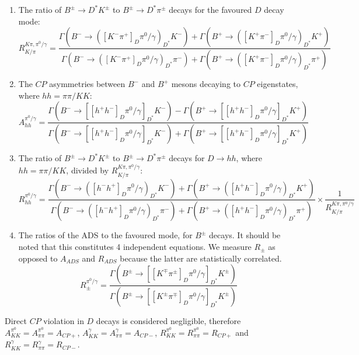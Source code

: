 \documentclass[oneside,12pt]{article}
\begin{document}
\begin{enumerate}
  \item The ratio of $B^{\pm} \rightarrow D^* K^{\pm}$ to $B^{\pm} \rightarrow
  D^* \pi^{\pm}$ decays for the favoured $D$ decay mode:
  \begin{equation}
    R^{K\pi , \pi^0 /\gamma}_{K/\pi}=\frac{\Gamma(B^{-}\rightarrow
    ([K^{-}\pi^{+}]_D\pi^0 /\gamma)_{D^*}K^{-})+\Gamma(B^{+}\rightarrow
    ([K^{+}\pi^{-}]_D\pi^0 /\gamma)_{D^*}K^{+})}{\Gamma(B^{-}\rightarrow
    ([K^{-}\pi^{+}]_D\pi^0 /\gamma)_{D^*}\pi^{-})+\Gamma(B^{+}\rightarrow
    ([K^{+}\pi^{-}]_D\pi^0 /\gamma)_{D^*}\pi^{+})}
	\label{eq:R_DstK_Dstpi}
  \end{equation}
  \item The $CP$ asymmetries between $B^{-}$ and $B^{+}$ mesons decaying to $CP$
  eigenstates, where $hh=\pi \pi /KK$:
		\begin{equation}
      A_{hh}^{\pi^{0}/\gamma}=\frac{\Gamma(B^{-}\rightarrow
      [[h^{+}h^{-}]_{D}\pi^{0}/\gamma]_{D^{*}}K^{-})-\Gamma(B^{+}\rightarrow
      [[h^{+}h^{-}]_{D}\pi^{0}/\gamma]_{D^{*}}K^{+})}{\Gamma(B^{-}\rightarrow
      [[h^{+}h^{-}]_{D}\pi^{0}/\gamma]_{D^{*}}K^{-})+\Gamma(B^{+}\rightarrow
      [[h^{+}h^{-}]_{D}\pi^{0}/\gamma]_{D^{*}}K^{+})} \label{eq:Aglw}
		\end{equation}
  \item The ratio of $B^{\pm} \rightarrow D^* K^{\pm}$ to $B^{\pm} \rightarrow
  D^* \pi^{\pm}$ decays for $D\rightarrow hh$, where $hh=\pi \pi /KK$, divided
  by $R^{K\pi , \pi^0 /\gamma}_{K/\pi}$:
		\begin{equation}
      R_{hh}^{\pi^{0}/\gamma}=\frac{\Gamma(B^{-}\rightarrow
      ([h^{-}h^{+}]_D\pi^0 /\gamma)_{D^*}K^{-})+\Gamma(B^{+}\rightarrow
      ([h^{+}h^{-}]_D\pi^0 /\gamma)_{D^*}K^{+})}{\Gamma(B^{-}\rightarrow
      ([h^{-}h^{+}]_D\pi^0 /\gamma)_{D^*}\pi^{-})+\Gamma(B^{+}\rightarrow
      ([h^{+}h^{-}]_D\pi^0 /\gamma)_{D^*}\pi^{+})} \times \frac{1}{R^{K\pi ,
      \pi^0 /\gamma}_{K/\pi}}
		\end{equation}
  \item The ratios of the ADS to the favoured mode, for $B^{\pm}$ decays. It
  should be noted that this constitutes 4 independent equations. We measure
  $R_{\pm}$ as opposed to $A_{ADS}$ and $R_{ADS}$ because the latter are
  statistically correlated. 
		\begin{equation}
			R_{\pm}^{\pi^{0}/\gamma}=\frac{\Gamma(B^{\pm}\rightarrow
			[[K^{\mp}\pi^{\pm}]_{D}\pi^{0}/\gamma]_{D^{*}}K^{\pm})}{\Gamma(B^{\pm}\rightarrow
			[[K^{\pm}\pi^{\mp}]_{D}\pi^{0}/\gamma]_{D^{*}}K^{\pm})} \label{eq:Rads}
		\end{equation}
\end{enumerate}
\noindent Direct $CP$ violation in $D$ decays is considered negligible, therefore
$A_{KK}^{\pi^{0}}=A_{\pi\pi}^{\pi^{0}}=A_{CP+}$,
$A_{KK}^{\gamma}=A_{\pi\pi}^{\gamma}=A_{CP-}$,
$R_{KK}^{\pi^{0}}=R_{\pi\pi}^{\pi^{0}}=R_{CP+}$ and
$R_{KK}^{\gamma}=R_{\pi\pi}^{\gamma}=R_{CP-}$.
\end{document}
